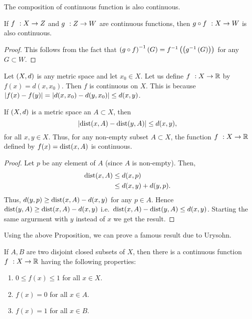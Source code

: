 The composition of continuous function is also continuous.
\begin{Proposition}
    If ${f}\hspace{0.05in}:{X}\to{Z}$ and ${g}\hspace{0.05in}:{Z}\to{W}$ are continuous functions, then ${{g}\circ{f}}\hspace{0.05in}:{X}\to{W}$ is also
    continuous.
\end{Proposition}
\begin{proof}
    This follows from the fact that ${({g}\circ{f})}^{-1}\left({G}\right) = {f}^{-1}\left({\left({g}^{-1}\left({G}\right)\right)}\right)$ for any
    $G \subset W$.
\end{proof}
\begin{Example}
    Let $\left(X,d\right)$ is any metric space and let $x_0 \in X$. Let us define ${f}\hspace{0.05in}:{X}\to{\mathbb{R}}$ by
    $f(x) = d(x,x_0)$. Then $f$ is continuous on $X$. This is because $\left\lvert{{f(x)}-{f(y)}}\right\rvert =
    \left\lvert{{d(x,x_0)}-{d(y,x_0)}}\right\rvert \leq d(x,y)$.
\end{Example}
\begin{Proposition}
    If $\left(X,d\right)$ is a metric space an $A \subset X$, then
    \[\left\lvert{{\operatorname{dist}(x,A)}-{\operatorname{dist}(y,A)}}\right\rvert \leq d(x,y),\]
    for all $x,y \in X$. Thus, for any non-empty subset $A \subset X$, the function ${f}\hspace{0.05in}:{X}\to{\mathbb{R}}$ defined
    by $f(x) = \operatorname{dist}(x,A)$ is continuous.
\end{Proposition}
\begin{proof}
    Let $p$ be any element of $A$ (since $A$ is non-empty). Then,
    \begin{align*}
	\operatorname{dist}(x,A) & \leq d(x,p)\\
	& \leq d(x,y) + d(y,p).
    \end{align*}
    Thus, $d(y,p) \geq \operatorname{dist}(x,A) - d(x,y)$ for any $p \in A$. Hence $\operatorname{dist}(y,A) \geq \operatorname{dist}(x,A) - d(x,y)$
    i.e.~$\operatorname{dist}(x,A) - \operatorname{dist}(y,A) \leq d(x,y)$. Starting the same argurment with $y$ instead of $x$ we get the
    result.
\end{proof}
Using the above Proposition, we can prove a famous result due to Urysohn.
\begin{Theorem}
    If $A,B$ are two disjoint closed subsets of $X$, then there is a continuous function ${f}\hspace{0.05in}:{X}\to{\mathbb{R}}$
    having the following properties:
    \begin{enumerate}
	\item
	    $0 \leq f(x) \leq 1$ for all $x \in X$.
	\item
	    $f(x) = 0$ for all $x \in A$.
	\item
	    $f(x) = 1$ for all $x \in B$.
    \end{enumerate}
\end{Theorem}
